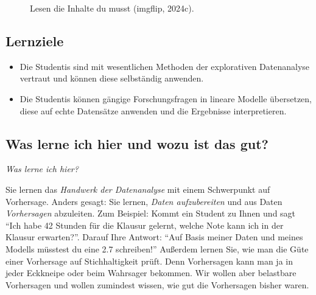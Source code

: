 \documentclass[
  letterpaper,
  twoside,
  open=any]{scrbook}
\theoremstyle{definition}
\theoremstyle{definition}
\theoremstyle{definition}
\theoremstyle{remark}
\begin{document}
\begin{figure}


\caption{\label{fig-yoda}Lesen die Inhalte du musst (imgflip, 2024c).}

\end{figure}%

\subsection{Lernziele}\label{lernziele}

\begin{itemize}
\item
  Die Studentis sind mit wesentlichen Methoden der explorativen
  Datenanalyse vertraut und können diese selbständig anwenden.
\item
  Die Studentis können gängige Forschungsfragen in lineare Modelle
  übersetzen, diese auf echte Datensätze anwenden und die Ergebnisse
  interpretieren.
\end{itemize}

\subsection{Was lerne ich hier und wozu ist das
gut?}\label{was-lerne-ich-hier-und-wozu-ist-das-gut}

\emph{Was lerne ich hier?}

Sie lernen das \emph{Handwerk der Datenanalyse} mit einem Schwerpunkt
auf Vorhersage. Anders gesagt: Sie lernen, \emph{Daten aufzubereiten}
und aus Daten \emph{Vorhersagen} abzuleiten. Zum Beispiel: Kommt ein
Student zu Ihnen und sagt \enquote{Ich habe 42 Stunden für die Klausur
gelernt, welche Note kann ich in der Klausur erwarten?}. Darauf Ihre
Antwort: \enquote{Auf Basis meiner Daten und meines Modells müsstest du
eine 2.7 schreiben!} Außerdem lernen Sie, wie man die Güte einer
Vorhersage auf Stichhaltigkeit prüft. Denn Vorhersagen kann man ja in
jeder Eckkneipe oder beim Wahrsager bekommen. Wir wollen aber belastbare
Vorhersagen und wollen zumindest wissen, wie gut die Vorhersagen bisher
waren.
\end{document}
